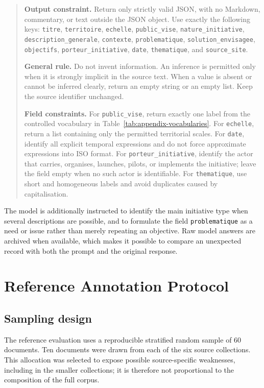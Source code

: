\documentclass[
11pt,
english,
singlespacing,
headsepline,
]{MastersDoctoralThesis}
\begin{document}
\begin{quote}\small
\textbf{Output constraint.} Return only strictly valid JSON, with no Markdown,
commentary, or text outside the JSON object. Use exactly the following keys:
\texttt{titre}, \texttt{territoire}, \texttt{echelle}, \texttt{public\_vise},
\texttt{nature\_initiative}, \texttt{description\_generale},
\texttt{contexte}, \texttt{problematique}, \texttt{solution\_envisagee},
\texttt{objectifs}, \texttt{porteur\_initiative}, \texttt{date},
\texttt{thematique}, and \texttt{source\_site}.

\medskip
\textbf{General rule.} Do not invent information. An inference is permitted
only when it is strongly implicit in the source text. When a value is absent or
cannot be inferred clearly, return an empty string or an empty list. Keep the
source identifier unchanged.

\medskip
\textbf{Field constraints.} For \texttt{public\_vise}, return exactly one
label from the controlled vocabulary in Table~\ref{tab:appendix-vocabularies}.
For \texttt{echelle}, return a list containing only the permitted territorial
scales. For \texttt{date}, identify all explicit temporal expressions and do
not force approximate expressions into ISO format. For
\texttt{porteur\_initiative}, identify the actor that carries, organises,
launches, pilots, or implements the initiative; leave the field empty when no
such actor is identifiable. For \texttt{thematique}, use short and homogeneous
labels and avoid duplicates caused by capitalisation.
\end{quote}

The model is additionally instructed to identify the main initiative type when
several descriptions are possible, and to formulate the field
\texttt{problematique} as a need or issue rather than merely repeating an
objective. Raw model answers are archived when available, which makes it
possible to compare an unexpected record with both the prompt and the original
response.

\chapter{Reference Annotation Protocol}

\section{Sampling design}

The reference evaluation uses a reproducible stratified random sample of 60
documents. Ten documents were drawn from each of the six source collections.
This allocation was selected to expose possible source-specific weaknesses,
including in the smaller collections; it is therefore not proportional to the
composition of the full corpus.
\end{document}
